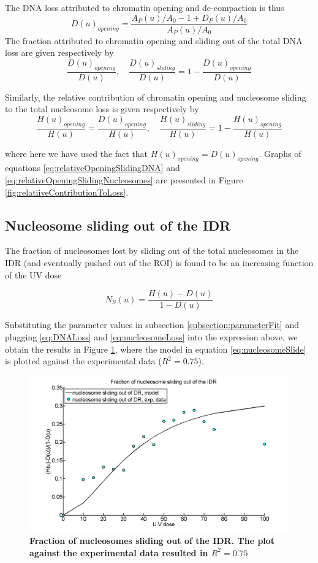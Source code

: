 \documentclass[12pt]{article}
\begin{document}
The DNA loss attributed to chromatin opening and de-compaction is thus
\begin{equation*}
D(u)_{opening}= \frac{A_P(u)/A_0 -1 +D_P(u)/A_0}{A_P(u)/A_0}
\end{equation*}	
The fraction attributed to chromatin opening and sliding out of the total
DNA loss are given respectively by
\begin{equation}\label{eq:relativeOpeningSlidingDNA}
\frac{D(u)_{opening}}{D(u)}, \quad \frac{D(u)_{sliding}}{D(u)}=1-\frac{D(u)_{opening}}{D(u)}
\end{equation}

Similarly, the relative contribution of chromatin opening and nucleosome
sliding to the total nucleosome loss is given respectively by
\begin{equation}\label{eq:relativeOpeningSlidingNucleosomes}
\frac{H(u)_{opening}}{H(u)} = \frac{D(u)_{opening}}{H(u)},\quad \frac{H(u)_{sliding}}{H(u)}=1-\frac{H(u)_{opening}}{H(u)}
\end{equation}

where here we have used the fact that $H(u)_{opening} = D(u)_{opening}$. Graphs of
equations \eqref{eq:relativeOpeningSlidingDNA} and \eqref{eq:relativeOpeningSlidingNucleosomes}  are presented in Figure \ref{fig:relatiiveContributionToLoss}.

\subsection{Nucleosome sliding out of the IDR}
The fraction of nucleosomes lost by sliding out of the total nucleosomes in the IDR
(and eventually pushed out of the ROI) is found to be an increasing function
of the UV dose

\begin{equation*}
N_S(u) = \frac{H(u)-D(u)}{1-D(u)}
\end{equation*}

Substituting the parameter values in subsection \ref{subsection:parameterFit} and plugging \eqref{eq:DNALoss} and \eqref{eq:nucleosomeLoss} into the expression above, we obtain the results in Figure \ref{fig:fractionSlidingOutOfIDR}, where the model
in equation \eqref{eq:nucleosomeSlide} is plotted against the experimental data ($R^2 = 0.75$).

\begin{figure}
\centering
\includegraphics[width=0.5\linewidth, height=0.3\textheight]{fractionSlidingOutOfIDR}
\caption{\textbf{Fraction of nucleosomes sliding out of the IDR. The plot
		against the experimental data resulted in $R^2 = 0.75$}}
\label{fig:fractionSlidingOutOfIDR}
\end{figure}
\end{document}
